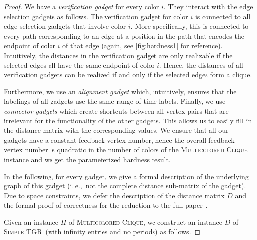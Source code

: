 \documentclass[a4paper,UKenglish,cleveref, autoref, thm-restate]{lipics-v2021}
\newcommand{\ie}{i.\,e.,\ }
\newcommand{\deltaExact}{\textsc{Simple TGR}}
\begin{document}
\begin{proof}
 We have a \emph{verification gadget} for every color $i$. They interact with the edge selection gadgets as follows.
 The verification gadget for color $i$ is connected to all edge selection gadgets that involve color $i$. More specifically, this is connected to every path corresponding to an edge at a position in the path that encodes the endpoint of color $i$ of that edge (again, see \cref{fig:hardness1} for reference). Intuitively, the distances in the verification gadget are only realizable if the selected edges all have the same endpoint of color $i$.
Hence, the distances of all verification gadgets can be realized if and only if the selected edges form a clique. 

Furthermore, we use an \emph{alignment gadget} which, intuitively, ensures that the labelings of all gadgets use the same range of time labels. Finally, we use \emph{connector gadgets} which create shortcuts between all vertex pairs that are irrelevant for the functionality of the other gadgets. This allows us to easily fill in the distance matrix with the corresponding values.
We ensure that all our gadgets have a constant feedback vertex number, hence the overall feedback vertex number is quadratic in the number of colors of the \textsc{Multicolored Clique} instance and we get the parameterized hardness result.

In the following, for every gadget, we give a formal description of the underlying graph of this gadget (\ie not the complete distance sub-matrix of the gadget). Due to space constraints, we defer the description of the distance matrix $D$ and the formal proof of correctness for the reduction to the full paper~\cite{fullPaper}.

    Given an instance $H$ of \textsc{Multicolored Clique}, we construct an instance $D$ of \deltaExact\ (with infinity entries and no periods) as follows. 
    

\end{proof}
\end{document}
